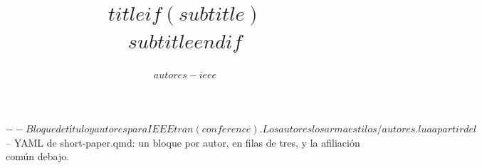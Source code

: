 $-- Bloque de título y autores para IEEEtran (conference). Los autores los arma estilos/autores.lua a partir del
$-- YAML de short-paper.qmd: un bloque por autor, en filas de tres, y la afiliación común debajo.
\title{$title$$if(subtitle)$\\[0.4em]{\normalsize $subtitle$}$endif$}
\author{$autores-ieee$}

